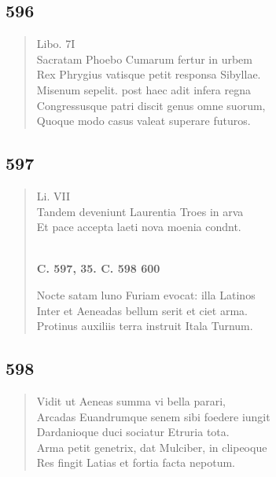 \documentclass[11pt, a4paper]{report}
\begin{document}
            \subsection*{596}
      \begin{verse}
      Libo. 7I \\ Sacratam Phoebo Cumarum fertur in urbem \\ Rex Phrygius vatisque petit responsa Sibyllae. \\ Misenum sepelit. post haec adit infera regna \\ Congressusque patri discit genus omne suorum, \\ Quoque modo casus valeat superare futuros. \\ 
      \end{verse}
  
            \subsection*{597}
      \begin{verse}
      Li. VII \\ Tandem deveniunt Laurentia Troes in arva \\ Et pace accepta laeti nova moenia condnt. \\ 
        ﻿\pagebreak 
    \begin{center} \textbf{C. 597, 35. C. 598 600} \end{center} \marginpar{[85]} Nocte satam luno Furiam evocat: illa Latinos \\ Inter et Aeneadas bellum serit et ciet arma. \\ Protinus auxiliis terra instruit Itala Turnum. \\ 
      \end{verse}
  
            \subsection*{598}
      \begin{verse}
      Vidit ut Aeneas summa vi bella parari, \\ Arcadas Euandrumque senem sibi foedere iungit \\ Dardanioque duci sociatur Etruria tota. \\ Arma petit genetrix, dat Mulciber, in clipeoque \\ Res fingit Latias et fortia facta nepotum. \\ 
      \end{verse}
  
\end{document}
